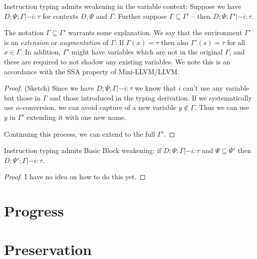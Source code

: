 \documentclass[a4paper, oneside, 10pt, draft]{memoir}
\begin{document}
\begin{lem}
  \label{lem:weaken-gamma}
  Instruction typing admits weakening in the variable context: Suppose
  we have $D;\Psi;\Gamma |- i : \tau$ for contexts $D, \Psi$ and
  $\Gamma$. Further suppose $\Gamma \subseteq \Gamma'$ -- then
  $D;\Psi;\Gamma' |- i : \tau$.
\end{lem}
\begin{rem}
  The notation $\Gamma \subseteq \Gamma'$ warrants some
  explanation. We say that the environment $\Gamma'$ is an
  \emph{extension} or \emph{augmentation} of $\Gamma$: If $\Gamma(x) =
  \tau$ then also $\Gamma'(s) = \tau$ for all $x \in \Gamma$. In
  addition, $\Gamma'$ might have variables which are not in the
  original $\Gamma$, and these are required to not shadow any existing
  variables. We note this is an accordance with the SSA property of
  Mini-LLVM/LLVM.
\end{rem}
\begin{proof}(Sketch)
  Since we have $D;\Psi;\Gamma |- i : \tau$ we know that $i$ can't use
  any variable but those in $\Gamma$ and those introduced in the
  typing derivation. If we systematically use $\alpha$-conversion, we
  can avoid capture of a new variable $y \not \in \Gamma$. Thus we can
  use $y$ in $\Gamma'$ extending it with one new name.

  Continuing this process, we can extend to the full $\Gamma'$.
\end{proof}
\begin{lem}
  \label{lem:weaken-psi}
  Instruction typing admits Basic Block weakening: if $D;\Psi;\Gamma
  |- i : \tau$ and $\Psi \subseteq \Psi'$ then $D;\Psi';\Gamma |- i :
  \tau$.
\end{lem}
\begin{proof}
  I have no idea on how to do this yet.
\end{proof}
\section{Progress}

\section{Preservation}
\end{document}
